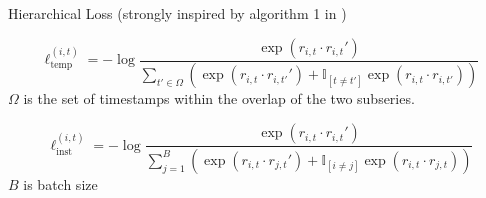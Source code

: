 \begin{algorithm}
\caption{Hierarchical Loss (strongly inspired by algorithm 1 in \cite{yue_ts2vec_2022})}\label{alg:cap}
\DontPrintSemicolon

  

\end{algorithm}






\[
\ell_{\text{temp}}^{(i,t)} = -\log{\frac{\exp{(r_{i,t} \cdot r_{i,t}')}}{\sum_{t'\in \Omega} \left( \exp{(r_{i,t} \cdot r_{i,t'}')} + \mathbb{I}_{[t\neq t']} \exp{(r_{i,t} \cdot r_{i,t'})}\right)}}
\]
$\Omega$ is the set of timestamps within the overlap of the two subseries. 

\[
\ell_{\text{inst}}^{(i,t)} = -\log{\frac{\exp{(r_{i,t} \cdot r_{i,t}')}}{\sum_{j=1}^B \left( \exp{(r_{i,t} \cdot r_{j,t}')} + \mathbb{I}_{[i\neq j]} \exp{(r_{i,t} \cdot r_{j,t})}\right)}}
\]
$B$ is batch size


